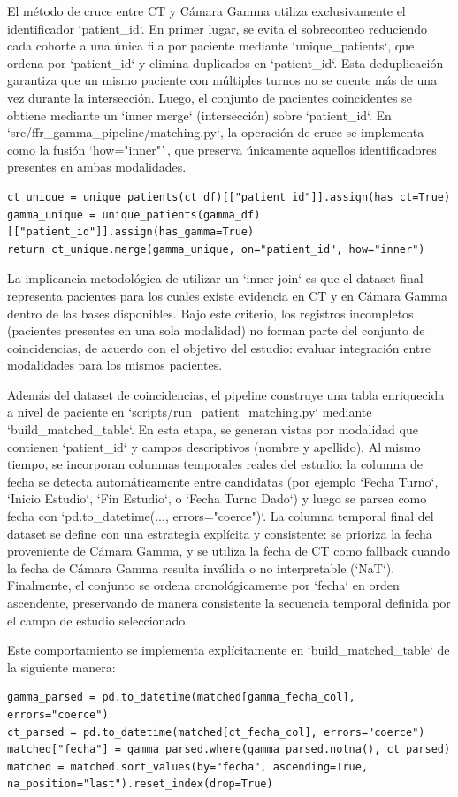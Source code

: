 El método de cruce entre CT y Cámara Gamma utiliza exclusivamente el identificador `patient_id`. En primer lugar, se evita el sobreconteo reduciendo cada cohorte a una única fila por paciente mediante `unique_patients`, que ordena por `patient_id` y elimina duplicados en `patient_id`. Esta deduplicación garantiza que un mismo paciente con múltiples turnos no se cuente más de una vez durante la intersección. Luego, el conjunto de pacientes coincidentes se obtiene mediante un `inner merge` (intersección) sobre `patient_id`. En `src/ffr_gamma_pipeline/matching.py`, la operación de cruce se implementa como la fusión `how="inner"`, que preserva únicamente aquellos identificadores presentes en ambas modalidades.
\begin{verbatim}
ct_unique = unique_patients(ct_df)[["patient_id"]].assign(has_ct=True)
gamma_unique = unique_patients(gamma_df)[["patient_id"]].assign(has_gamma=True)
return ct_unique.merge(gamma_unique, on="patient_id", how="inner")
\end{verbatim}
La implicancia metodológica de utilizar un `inner join` es que el dataset final representa pacientes para los cuales existe evidencia en CT y en Cámara Gamma dentro de las bases disponibles. Bajo este criterio, los registros incompletos (pacientes presentes en una sola modalidad) no forman parte del conjunto de coincidencias, de acuerdo con el objetivo del estudio: evaluar integración entre modalidades para los mismos pacientes.

Además del dataset de coincidencias, el pipeline construye una tabla enriquecida a nivel de paciente en `scripts/run_patient_matching.py` mediante `build_matched_table`. En esta etapa, se generan vistas por modalidad que contienen `patient_id` y campos descriptivos (nombre y apellido). Al mismo tiempo, se incorporan columnas temporales reales del estudio: la columna de fecha se detecta automáticamente entre candidatas (por ejemplo `Fecha Turno`, `Inicio Estudio`, `Fin Estudio`, o `Fecha Turno Dado`) y luego se parsea como fecha con `pd.to_datetime(..., errors="coerce")`. La columna temporal final del dataset se define con una estrategia explícita y consistente: se prioriza la fecha proveniente de Cámara Gamma, y se utiliza la fecha de CT como fallback cuando la fecha de Cámara Gamma resulta inválida o no interpretable (`NaT`). Finalmente, el conjunto se ordena cronológicamente por `fecha` en orden ascendente, preservando de manera consistente la secuencia temporal definida por el campo de estudio seleccionado.

Este comportamiento se implementa explícitamente en `build_matched_table` de la siguiente manera:
\begin{verbatim}
gamma_parsed = pd.to_datetime(matched[gamma_fecha_col], errors="coerce")
ct_parsed = pd.to_datetime(matched[ct_fecha_col], errors="coerce")
matched["fecha"] = gamma_parsed.where(gamma_parsed.notna(), ct_parsed)
matched = matched.sort_values(by="fecha", ascending=True, na_position="last").reset_index(drop=True)
\end{verbatim}

